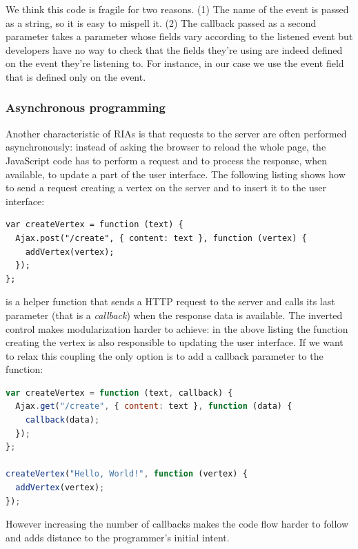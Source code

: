 \documentclass[american,english,runningheads]{llncs}
\begin{document}
We think this code is fragile for two reasons. (1) The name of the event is passed as a string, so it is easy to
mispell it. (2) The callback passed as a second parameter takes a parameter  whose fields vary according to
the listened event but developers have no way to check that the fields they’re using are indeed defined on the event
they’re listening to. For instance, in our case we use the  event field that is defined only on the
 event.

\subsubsection{Asynchronous programming}

Another characteristic of RIAs is that requests to the server are often performed asynchronously: instead of asking
the browser to reload the whole page, the JavaScript code has to perform a request and to process the response, when
available, to update a part of the user interface. The following listing shows how to send a request creating a
vertex on the server and to insert it to the user interface:

\begin{lstlisting}
var createVertex = function (text) {
  Ajax.post("/create", { content: text }, function (vertex) {
    addVertex(vertex);
  });
};
\end{lstlisting}

 is a helper function that sends a HTTP request to the server and calls its last parameter
(that is a \emph{callback}) when the response data is available. The inverted control makes modularization harder to
achieve: in the above listing the function creating the vertex is also responsible to updating the user interface.
If we want to relax this coupling the only option is to add a callback parameter to the  function:

\begin{lstlisting}[language=JavaScript,label=async-js,caption=Callback-driven JavaScript APIs]
var createVertex = function (text, callback) {
  Ajax.get("/create", { content: text }, function (data) {
    callback(data);
  });
};

createVertex("Hello, World!", function (vertex) {
  addVertex(vertex);
});
\end{lstlisting}

However increasing the number of callbacks makes the code flow harder to follow and adds distance to the programmer's
initial intent.
\end{document}
